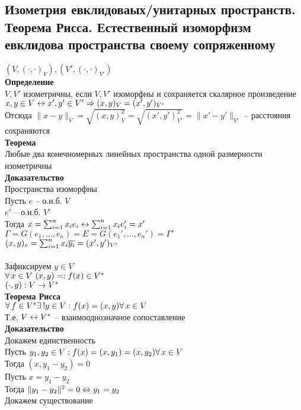 \documentclass[12pt]{article}
\begin{document}
\subsection{Изометрия евклидоваых/унитарных пространств. Теорема Рисса. Естественный изоморфизм евклидова пространства своему сопряженному}
$(V, (\cdot, \cdot)_V), (V', (\cdot, \cdot)_{V'})$\\
\textbf{Определение}\\
$V, V'$ изометричны, если $V, V'$ изоморфны и сохраняется скалярное произведение\\
$x,y\in V \leftrightarrow x',y' \in V' \Rightarrow (x,y)_V = (x', y')_{V'}$\\
Отсюда $\|x-y\|_V = \sqrt{(x,y)_V^2} = \sqrt{(x',y')_{V'}^2} = \|x'-y'\|_{V'}$ -- расстояния сохраняются\\
\textbf{Теорема}\\
Любые два конечномерных линейных пространства одной размерности изометричны\\
\textbf{Доказательство}\\
Пространства изоморфны\\
Пусть $e$ -- о.н.б. $V$\\
$e'$ -- о.н.б. $V'$\\
Тогда $x = \sum_{i=1}^n x_i e_i \leftrightarrow \sum_{i=1}^n x_i e_i' = x'$\\
$\Gamma = G(e_1, \ldots, e_n) = E = G(e_1', \ldots, e_n') = \Gamma'$\\
$(x,y)_v = \sum_{i=1}^n x_i\overline{y_i} = (x',y')_{V'}$\\\\
Зафиксируем $y \in V$\\
$\forall\, x \in V\ (x,y)=:f(x) \in V^*$\\
$(\cdot, y): V \rightarrow V^*$\\
\textbf{Теорема Рисса}\\
$\forall\, f \in V^* \exists\,! y \in V: f(x) = (x,y) \forall\, x \in V$\\
Т.е. $V \leftrightarrow V^*$ -- взаимооднозначное сопоставление\\
\textbf{Доказательство}\\
Докажем единственность\\
Пусть $y_1, y_2 \in V: f(x) = (x, y_1) = (x, y_2) \forall\, x \in V$\\
Тогда $(x, y_1 - y_2) = 0$\\
Пусть $x = y_1 - y_2$\\
Тогда $\|y_1-y_2\|^2 = 0 \Leftrightarrow y_1 = y_2$\\
Докажем существование\\
\end{document}
